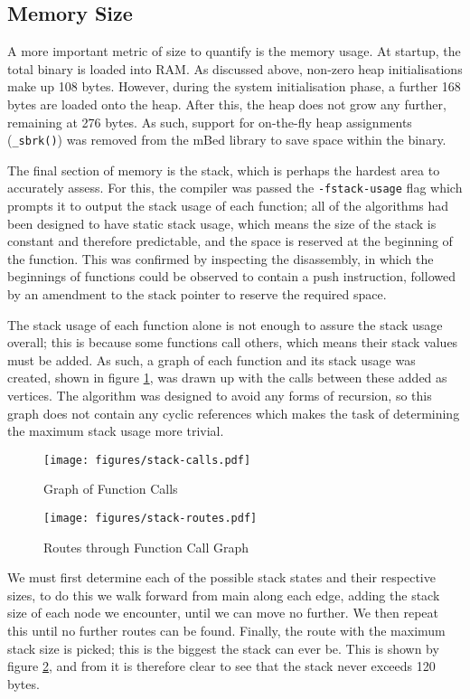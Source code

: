 \subsection{Memory Size}

A more important metric of size to quantify is the memory usage. At startup, the total binary is loaded into RAM. As discussed above, non-zero heap initialisations make up 108 bytes. However, during the system initialisation phase, a further 168 bytes are loaded onto the heap. After this, the heap does not grow any further, remaining at 276 bytes. As such, support for on-the-fly heap assignments (\verb|_sbrk()|) was removed from the mBed library to save space within the binary.

The final section of memory is the stack, which is perhaps the hardest area to accurately assess. For this, the compiler was passed the \verb|-fstack-usage| flag which prompts it to output the stack usage of each function; all of the algorithms had been designed to have static stack usage, which means the size of the stack is constant and therefore predictable, and the space is reserved at the beginning of the function. This was confirmed by inspecting the disassembly, in which the beginnings of functions could be observed to contain a push instruction, followed by an amendment to the stack pointer to reserve the required space.

The stack usage of each function alone is not enough to assure the stack usage overall; this is because some functions call others, which means their stack values must be added. As such, a graph of each function and its stack usage was created, shown in figure \ref{fig:stack-calls}, was drawn up with the calls between these added as vertices. The algorithm was designed to avoid any forms of recursion, so this graph does not contain any cyclic references which makes the task of determining the maximum stack usage more trivial.

\begin{figure}[!h]
    \centering
    \texttt{[image: figures/stack-calls.pdf]}
    \caption{Graph of Function Calls}
    \label{fig:stack-calls}
\end{figure}

\begin{figure}[!h]
    \centering
    \texttt{[image: figures/stack-routes.pdf]}
    \caption{Routes through Function Call Graph}
    \label{fig:stack-routes}
\end{figure}

We must first determine each of the possible stack states and their respective sizes, to do this we walk forward from main along each edge, adding the stack size of each node we encounter, until we can move no further. We then repeat this until no further routes can be found. Finally, the route with the maximum stack size is picked; this is the biggest the stack can ever be. This is shown by figure \ref{fig:stack-routes}, and from it is therefore clear to see that the stack never exceeds 120 bytes.

